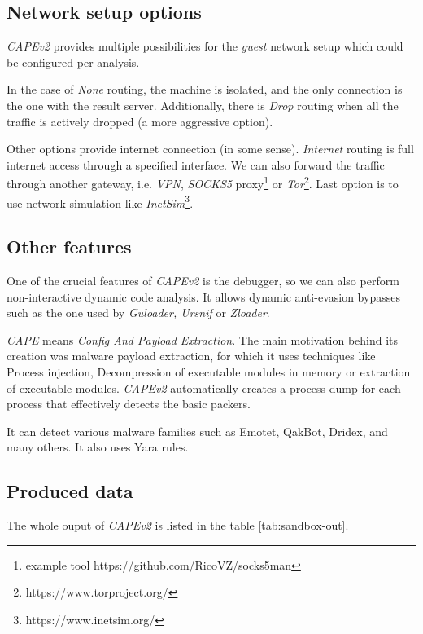 \subsection{Network setup options}
\emph{CAPEv2} provides multiple possibilities for the \emph{guest} network setup which could be configured per analysis. 

In the case of \emph{None} routing, the machine is isolated, and the only connection is the one with the result server. Additionally, there is \emph{Drop} routing when all the traffic is actively dropped (a more aggressive option). 

Other options provide internet connection (in some sense). \emph{Internet} routing is full internet access through a specified interface. We can also forward the traffic through another gateway, i.e. \emph{VPN}, \emph{SOCKS5} proxy\footnote{example tool https://github.com/RicoVZ/socks5man} or \emph{Tor}\footnote{https://www.torproject.org/}. Last option is to use network simulation like \emph{InetSim}\footnote{https://www.inetsim.org/}.

\subsection{Other features}
One of the crucial features of \emph{CAPEv2} is the debugger, so we can also perform non-interactive dynamic code analysis. It allows dynamic anti-evasion bypasses such as the one used by \emph{Guloader, Ursnif} or \emph{Zloader}.

\emph{CAPE} means \emph{Config And Payload Extraction}. The main motivation behind its creation was malware payload extraction, for which it uses techniques like Process injection, Decompression of executable modules in memory or extraction of executable modules. \emph{CAPEv2} automatically creates a process dump for each process that effectively detects the basic packers.

It can detect various malware families such as Emotet, QakBot, Dridex, and many others. It also uses Yara rules.

\subsection{Produced data}
The whole ouput of \emph{CAPEv2} is listed in the table \ref{tab:sandbox-out}.

